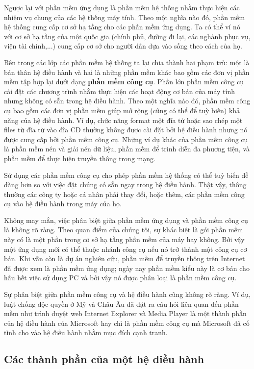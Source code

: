 Ngược lại với phần mềm ứng dụng là phần mềm hệ thống nhằm thực hiện các nhiệm vụ chung của
các hệ thống máy tính. Theo một nghĩa nào đó, phần mềm hệ thống cung cấp cơ sở hạ tầng cho
các phần mềm ứng dụng. Ta có thể ví nó với cơ sở hạ tầng của một quốc gia (chính
phủ, đường đi lại, các nghành phục vụ, viện tài chính,...) cung cấp cơ sở cho người dân
dựa vào sống theo cách của họ.

Bên trong các lớp các phần mềm hệ thống ta lại chia thành hai phạm trù: một là bản thân hệ
điều hành và hai là những phần mềm khác bao gồm các đơn vị phần mềm tập hợp lại dưới dạng
\textbf{phần mềm công cụ}. Phần lớn phần mềm công cụ cài đặt các chương trình nhằm thực
hiện các hoạt động cơ bản của máy tính nhưng không có sẵn trong hệ điều hành. Theo một
nghĩa nào đó, phần mềm công cụ bao gồm các đơn vị phần mềm giúp mở rộng (cũng có thể để
tuỳ biến) khả năng của hệ điều hành. Ví dụ, chức năng format một đĩa từ hoặc sao chép một
files từ đĩa từ vào đĩa CD thường không được cài đặt bởi hệ điều hành nhưng nó được cung
cấp bởi phần mềm công cụ. Những ví dụ khác của phần mềm công cụ là phần mềm nén và giải
nén dữ liệu, phần mềm để trình diễn đa phương tiện, và phần mềm để thực hiện truyền thông
trong mạng.

Sử dụng các phần mềm công cụ cho phép phần mềm hệ thống có thể tuỳ biến dễ dàng hơn so với
việc đặt chúng có sẵn ngay trong hệ điều hành. Thật vậy, thông thường các công ty hoặc cá
nhân phải thay đổi, hoặc thêm, các phần mềm công cụ vào hệ điều hành trong máy của họ.

Không may mắn, việc phân biệt giữa phần mềm ứng dụng và phần mềm công cụ là không rõ
ràng. Theo quan điểm của chúng tôi, sự khác biệt là gói phần mềm này có là một phần trong
cơ sở hạ tầng phần mềm của máy hay không. Bởi vậy một ứng dụng mới có thể thuộc nhánh công
cụ nếu nó trở thành một công cụ cơ bản. Khi vẫn còn là dự án nghiên cứu, phần mềm để
truyền thông trên Internet đã được xem là phần mềm ứng dụng; ngày nay phần mềm kiểu này là
cơ bản cho hầu hết việc sử dụng PC và bởi vậy nó được phân loại là phần mềm công cụ.



Sự phân biệt giữa phần mềm công cụ và hệ điều hành cũng không rõ ràng. Ví dụ, luật chống
độc quyền ở Mỹ và Châu Âu đã đặt ra câu hỏi liên quan đến phần mềm như trình duyệt web
Internet Explorer và Media Player là một thành phần của hệ điều hành của Microsoft hay chỉ
là phần mềm công cụ mà Microsoft đã cố tình cho vào hệ điều hành nhằm mục đích cạnh tranh.


\subsection*{Các thành phần của một hệ điều hành}

